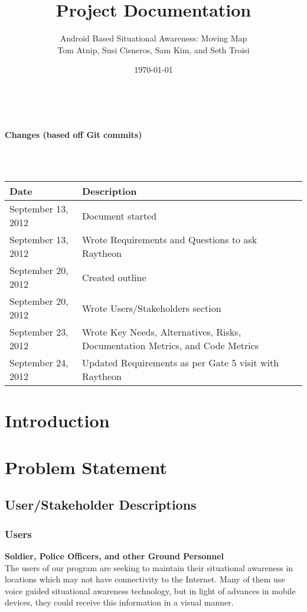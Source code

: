\documentclass{article}
\begin{document}
\setlength{\voffset}{3.5in}
\title{Project Documentation}
\author{\Large Android Based Situational Awareness: Moving Map\\
Tom Atnip, Susi Cisneros, Sam Kim, and Seth Troisi}
\date{\today}
\maketitle
\clearpage
\setlength{\voffset}{0pt}
\tableofcontents
\clearpage
~\\
\begin{Large}\textbf{Changes (based off Git commits)}\end{Large}\\
~\\
\begin{tabular}{ | p{1.5in} | p{4.5in} | }
\hline
\textbf{Date} & \textbf{Description}\\
\hline
\hline
September 13, 2012 & Document started\\
\hline
September 13, 2012 & Wrote Requirements and Questions to ask Raytheon\\
\hline
September 20, 2012 & Created outline\\
\hline
September 20, 2012 & Wrote Users/Stakeholders section\\
\hline
September 23, 2012 & Wrote Key Needs, Alternatives, Risks, Documentation Metrics, and Code Metrics\\
\hline
September 24, 2012 & Updated Requirements as per Gate 5 visit with Raytheon\\
\hline
\end{tabular}
\clearpage

\section{Introduction}

\section{Problem Statement}
\subsection{User/Stakeholder Descriptions}
\subsubsection{Users} 
\textbf{Soldier, Police Officers, and other Ground Personnel}\\
The users of our program are seeking to maintain their situational awareness in locations which may not have connectivity to the Internet.  Many of them use voice guided situational awareness technology, but in light of advances in mobile devices, they could receive this information in a visual manner.  
\end{document}
